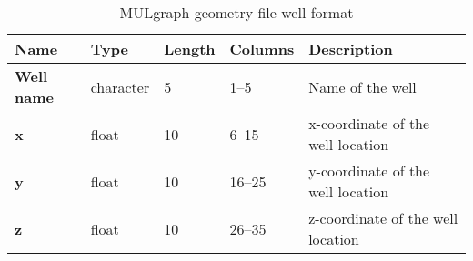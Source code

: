 \begin{table}[h]
  \begin{center}
    \begin{tabular}{|p{20mm}|l|l|l|p{50mm}|}
      \hline
      \textbf{Name} & \textbf{Type} & \textbf{Length} & \textbf{Columns} & \textbf{Description}\\
      \hline
      \textbf{Well name} & character & 5 & 1--5 & Name of the well\\
      \hline
      \textbf{x} & float & 10 & 6--15 & x-coordinate of the well location\\
      \hline
      \textbf{y} & float & 10 & 16--25 & y-coordinate of the well location\\
      \hline
      \textbf{z} & float & 10 & 26--35 & z-coordinate of the well location\\
      \hline
    \end{tabular}
    \caption{MULgraph geometry file well format}
    \label{tb:mulgraph_format_wells}
  \end{center}
\end{table}

